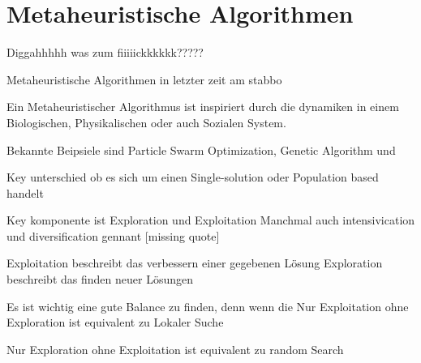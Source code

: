 \section{Metaheuristische Algorithmen}

Diggahhhhh was zum fiiiiickkkkkk?????

Metaheuristische Algorithmen in letzter zeit am stabbo

Ein Metaheuristischer Algorithmus ist inspiriert durch die dynamiken in einem Biologischen, Physikalischen
oder auch Sozialen System.

Bekannte Beipsiele sind Particle Swarm Optimization, Genetic Algorithm 
und 

Key unterschied ob es sich um einen Single-solution oder Population based handelt



Key komponente ist Exploration und Exploitation
Manchmal auch intensivication und diversification gennant [missing quote]

Exploitation beschreibt das verbessern einer gegebenen Lösung
Exploration beschreibt das finden neuer Lösungen

Es ist wichtig eine gute Balance zu finden, denn wenn die 
Nur Exploitation ohne Exploration ist equivalent zu Lokaler Suche

Nur Exploration ohne Exploitation ist equivalent zu random Search

